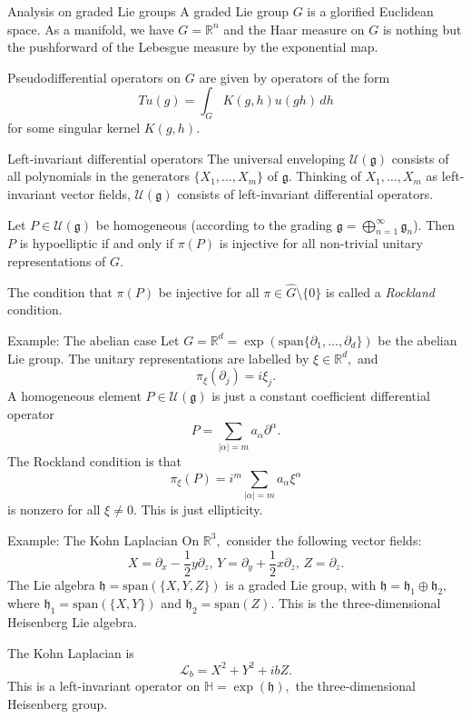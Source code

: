 \documentclass{beamer}
\numberwithin{equation}{section}
\theoremstyle{plain}
\theoremstyle{plain}
\theoremstyle{definition}
\theoremstyle{plain}
\theoremstyle{plain}
\theoremstyle{definition}
\newcommand{\Rl}{\mathbb{R}}
\newcommand{\Lc}{\mathcal{L}}
\newcommand{\Uc}{\mathcal{U}}
\newcommand{\gf}{\mathfrak{g}}
\begin{document}
\begin{frame}{Analysis on graded Lie groups}
    A graded Lie group $G$ is a glorified Euclidean space. As a manifold, we have $G=\Rl^n$ and the Haar measure on $G$ is nothing but the pushforward of the Lebesgue measure by the exponential map.\pause

    Pseudodifferential operators on $G$ are given by operators of the form
    \[
        Tu(g) = \int_{G} K(g,h)u(gh)\,dh
    \]
    for some singular kernel $K(g,h).$
\end{frame}

\begin{frame}{Left-invariant differential operators}
    The universal enveloping $\Uc(\gf)$ consists of all polynomials in the generators $\{X_1,\ldots,X_m\}$ of $\gf.$ Thinking of $X_1,\ldots,X_m$ as left-invariant vector fields, $\Uc(\gf)$ consists of left-invariant differential operators.
    \begin{theorem}
        Let $P \in \Uc(\gf)$ be homogeneous (according to the grading $\gf=\bigoplus_{n=1}^\infty \gf_n$). Then $P$ is hypoelliptic if and only if $\pi(P)$ is injective for all non-trivial unitary representations of $G.$
    \end{theorem}
    \pause
    The condition that $\pi(P)$ be injective for all $\pi\in\widehat{G}\setminus \{0\}$ is called a \emph{Rockland} condition.
\end{frame}

\begin{frame}{Example: The abelian case}
    Let $G = \Rl^d=\exp(\mathrm{span}\{\partial_1,\ldots,\partial_d\})$ be the abelian Lie group. The unitary representations are labelled by $\xi \in \Rl^d,$ and
    \[
        \pi_{\xi}(\partial_j) = i\xi_j.
    \]
    A homogeneous element $P\in \Uc(\gf)$ is just a constant coefficient differential operator
    \[
        P = \sum_{|\alpha|=m} a_{\alpha}\partial^{\alpha}.
    \]
    The Rockland condition is that
    \[
        \pi_{\xi}(P) = i^m\sum_{|\alpha|=m} a_{\alpha}\xi^{\alpha}
    \]
    is nonzero for all $\xi\neq 0$. This is just ellipticity.
\end{frame}

\begin{frame}{Example: The Kohn Laplacian}
    On $\Rl^3,$ consider the following vector fields:
    \[
        X = \partial_x-\frac12y\partial_z,\, Y = \partial_y+\frac12x\partial_z,\, Z = \partial_z.
    \]
    The Lie algebra $\mathfrak{h}=\mathrm{span}(\{X,Y,Z\})$ is a graded Lie group, with $\mathfrak{h}=\mathfrak{h}_1\oplus \mathfrak{h}_2,$ where $\mathfrak{h}_1 = \mathrm{span}(\{X,Y\})$ and $\mathfrak{h}_2 = \mathrm{span}(Z).$ This is the three-dimensional Heisenberg Lie algebra.

    The Kohn Laplacian is
    \[
        \Lc_b = X^2+Y^2+ibZ.
    \]
    This is a left-invariant operator on $\mathbb{H}=\exp(\mathfrak{h}),$ the three-dimensional Heisenberg group.
\end{frame}
\end{document}
